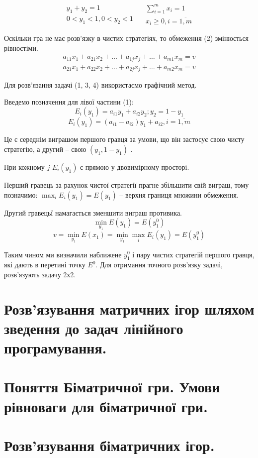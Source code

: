 \documentclass[12pt,a4paper]{report}
\begin{document}
\begin{equation}
\begin{array}{c}
y_1+y_2=1\\
0<y_1<1, 0<y_2<1
\end{array}
\quad
\begin{array}{c}
\sum_{i=1}^m x_i=1\\
x_i \ge 0, i=\overline{1,m}
\end{array}
\end{equation}

Оскільки гра не має розв'язку в чистих стратегіях, то обмеження (2) змінюється рівностіми.
\begin{equation}
\begin{array}{l}
a_{11}x_1+a_{21}x_2+\dots+a_{1j}x_j+\dots+a_{m1}x_m = v\\
a_{21}x_1+a_{22}x_2+\dots+a_{2j}x_j+\dots+a_{m2}x_m = v
\end{array}
\end{equation}

Для розв'язання задачі (1, 3, 4) використаємо графічний метод.

Введемо позначення для лівої частини (1):
\[E_i(y_1) = a_{i1}y_1+a_{i2}y_2; y_2=1-y_1\]
\begin{equation}
E_i(y_1)=(a_{i1}-a_{i2})y_1+a_{i2}, i=\overline{1,m}
\end{equation}

Це є середнім виграшом першого гравця за умови, що він застосує свою чисту стратегію, а другий -- свою $(y_1,1-y_1)$ .

При кожному $j$ $E_i(y_1)$ є прямою у двовимірному просторі.

Перший гравець за рахунок чистої стратегії прагне збільшити свій виграш, тому позначимо:
$\displaystyle \max_iE_i(y_1)=E(y_1)$ -- верхня границя множини обмеження.

Другий гравецьї намагається зменшити виграш противика.
\[\min_{y_1} E(y_1) = E(y_1^0)\]
\[v=\min_{y_1} E(x_1)=\min_{y_1} \max_iE_i(y_1)=E(y_1^0)\]

Таким чином ми визначили наближене $y_1^0$ і пару чистих стратегій першого гравця, які дають в перетині точку $E^0$. Для отримання точного розв'язку задачі, розв'язують задачу 2х2. 

\clearpage

\chapter{Розв'язування матричних ігор шляхом зведення до задач лінійного програмування.}

\clearpage

\chapter{Поняття Біматричної гри. Умови рівноваги для біматричної гри.}

\clearpage

\chapter{Розв'язування біматричних ігор.}
\end{document}
